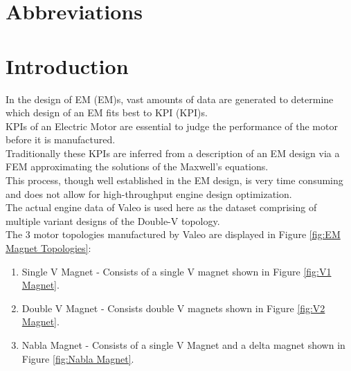 \documentclass{report} %
\begin{document}
\newpage

\newpage

\begin{spacing}{1.2}
    \tableofcontents
\end{spacing}

\newpage

\newpage

\chapter*{Abbreviations}
\begin{acronym}[TDMA]
  

\end{acronym}

\newpage

\newpage

\chapter{Introduction} 
In the design of \acl{EM} (\ac{EM})s, vast amounts of data are generated to determine which design of an \ac{EM} fits best to \acl{KPI} (\ac{KPI})s. \\
\ac{KPI}s of an Electric Motor are essential to judge the performance of the motor before it is manufactured. \\
Traditionally these \ac{KPI}s are inferred from a description of an \ac{EM} design via a \ac{FEM} approximating the solutions of the Maxwell’s equations. \\
This process, though well established in the \ac{EM} design, is very time consuming and does not allow for high-throughput engine design optimization. \\
The actual engine data of Valeo is used here as the dataset comprising of multiple variant designs of the Double-V topology.\\

The 3 motor topologies manufactured by Valeo are displayed in Figure \ref{fig:EM Magnet Topologies}:
\begin{enumerate}
    \item Single V Magnet - Consists of a single V magnet shown in Figure \ref{fig:V1 Magnet}.
    \item Double V Magnet - Consists double V magnets shown in Figure \ref{fig:V2 Magnet}.
    \item Nabla Magnet - Consists of a single V Magnet and a delta magnet shown in Figure \ref{fig:Nabla Magnet}.
\end{enumerate}
\end{document}
